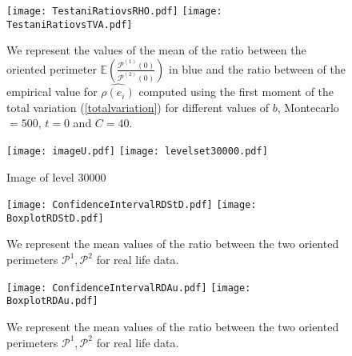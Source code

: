 \documentclass[12pt]{article}
\renewcommand{\hat}{\widehat}
\theoremstyle{Theorem}
\begin{document}
{\begin{figure}[H]
  \centering
    {\texttt{[image: TestaniRatiovsRHO.pdf]}}
    {\texttt{[image: TestaniRatiovsTVA.pdf]}}
    \hspace{0.2cm} 
 \caption{We represent the values of the mean of the ratio between the oriented perimeter $\mathbb{E}\left(\frac{\mathcal{P}^{(1)}(0)}{\mathcal{P}^{(2)}(0)}\right)$ in blue and the ratio between of the empirical value for $\hat{\rho(e_i)}$ computed using the first moment of the total variation (\ref{totalvariation}) for different values of $b$, Montecarlo $= 500$, $t = 0$ and $C = 40$.}
\label{fig2}
\end{figure}


\begin{figure}[H]
  \centering
    {\texttt{[image: imageU.pdf]}}
    \hspace{3cm}
    {\texttt{[image: levelset30000.pdf]}}
    \hspace{0.2cm}
 \caption{ Image of level $30000$}
\label{fig2}
\end{figure}

\begin{figure}[H]
  \centering
    {\texttt{[image: ConfidenceIntervalRDStD.pdf]}}
    {\texttt{[image: BoxplotRDStD.pdf]}}
    \hspace{0.2cm}
 \caption{We represent the mean values of the ratio between the two oriented perimeters $\mathcal{P}^{1}, \mathcal{P}^{2}$ for real life data.}
\label{fig2}
\end{figure}


\begin{figure}[H]
  \centering
    {\texttt{[image: ConfidenceIntervalRDAu.pdf]}}
    {\texttt{[image: BoxplotRDAu.pdf]}}
    \hspace{0.2cm}
 \caption{We represent the mean values of the ratio between the two oriented perimeters $\mathcal{P}^{1}, \mathcal{P}^{2}$ for real life data.}
\label{fig2}
\end{figure}
\appendix 
}
\end{document}
